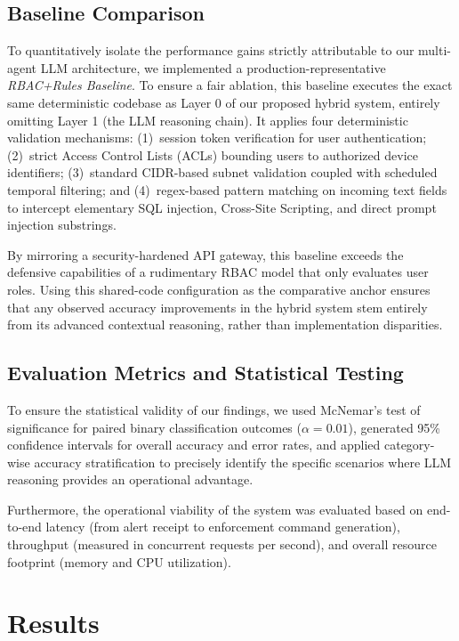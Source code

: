 \documentclass[
]{ceurart}
\begin{document}
\subsection{Baseline Comparison}

To quantitatively isolate the performance gains strictly attributable to our multi-agent LLM architecture, we implemented a production-representative \textit{RBAC+Rules Baseline}. To ensure a fair ablation, this baseline executes the exact same deterministic codebase as Layer 0 of our proposed hybrid system, entirely omitting Layer 1 (the LLM reasoning chain). It applies four deterministic validation mechanisms: (1)~session token verification for user authentication; (2)~strict Access Control Lists (ACLs) bounding users to authorized device identifiers; (3)~standard CIDR-based subnet validation coupled with scheduled temporal filtering; and (4)~regex-based pattern matching on incoming text fields to intercept elementary SQL injection, Cross-Site Scripting, and direct prompt injection substrings.

By mirroring a security-hardened API gateway, this baseline exceeds the defensive capabilities of a rudimentary RBAC model that only evaluates user roles. Using this shared-code configuration as the comparative anchor ensures that any observed accuracy improvements in the hybrid system stem entirely from its advanced contextual reasoning, rather than implementation disparities.


\subsection{Evaluation Metrics and Statistical Testing}

To ensure the statistical validity of our findings, we used McNemar's test of significance for paired binary classification outcomes ($\alpha=0.01$), generated 95\% confidence intervals for overall accuracy and error rates, and applied category-wise accuracy stratification to precisely identify the specific scenarios where LLM reasoning provides an operational advantage.

Furthermore, the operational viability of the system was evaluated based on end-to-end latency (from alert receipt to enforcement command generation), throughput (measured in concurrent requests per second), and overall resource footprint (memory and CPU utilization).

\section{Results}
\end{document}
